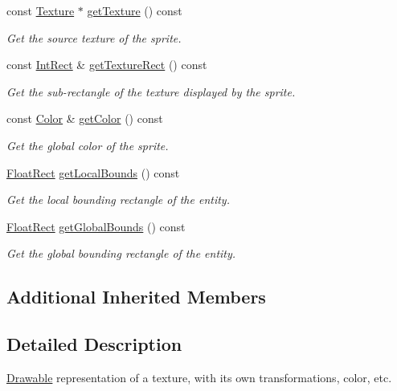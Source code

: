 \begin{DoxyCompactItemize}
const \hyperlink{classsf_1_1Texture}{Texture} $\ast$ \hyperlink{classsf_1_1Sprite_a2c4fbb983b29e14f9bb69a3a75feae46}{get\-Texture} () const 
\begin{DoxyCompactList}\small\item\em Get the source texture of the sprite. \end{DoxyCompactList}\item 
const \hyperlink{classsf_1_1Rect}{Int\-Rect} \& \hyperlink{classsf_1_1Sprite_a89aa58bc39e2072c6afe7c547d27b5a0}{get\-Texture\-Rect} () const 
\begin{DoxyCompactList}\small\item\em Get the sub-\/rectangle of the texture displayed by the sprite. \end{DoxyCompactList}\item 
const \hyperlink{classsf_1_1Color}{Color} \& \hyperlink{classsf_1_1Sprite_ab05fafd4e9999608a5cae4985e7b52df}{get\-Color} () const 
\begin{DoxyCompactList}\small\item\em Get the global color of the sprite. \end{DoxyCompactList}\item 
\hyperlink{classsf_1_1Rect}{Float\-Rect} \hyperlink{classsf_1_1Sprite_a69557a8369bc2e26dd2e2eb2c50f5c90}{get\-Local\-Bounds} () const 
\begin{DoxyCompactList}\small\item\em Get the local bounding rectangle of the entity. \end{DoxyCompactList}\item 
\hyperlink{classsf_1_1Rect}{Float\-Rect} \hyperlink{classsf_1_1Sprite_a203d2d8087bfdca2ebc3c0485cdb7409}{get\-Global\-Bounds} () const 
\begin{DoxyCompactList}\small\item\em Get the global bounding rectangle of the entity. \end{DoxyCompactList}\end{DoxyCompactItemize}
\subsection*{Additional Inherited Members}


\subsection{Detailed Description}
\hyperlink{classsf_1_1Drawable}{Drawable} representation of a texture, with its own transformations, color, etc. 

